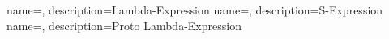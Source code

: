 
%
{%
    name=\lexpgl,%
    description={Lambda-Expression}%
}
%
{%
    name=\sexpgl,%
    description={S-Expression}%
}
%
{%
    name=\pexpgl,%
    description={Proto Lambda-Expression}%
}
